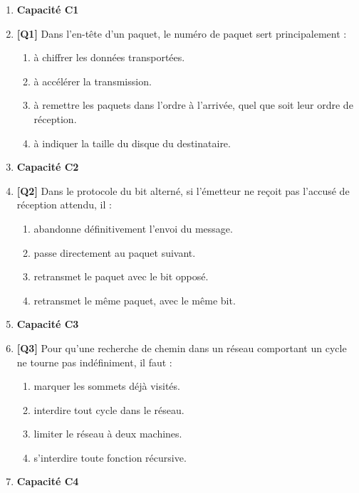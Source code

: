 \begin{enumerate}

\item[] \textbf{Capacité C1}

\item \textbf{[Q1]} Dans l'en-tête d'un paquet, le numéro de paquet sert principalement :
  \begin{enumerate}[label=\Alph*.]
    \item à chiffrer les données transportées.
    \item à accélérer la transmission.
    \item à remettre les paquets dans l'ordre à l'arrivée, quel que soit leur ordre de réception.
    \item à indiquer la taille du disque du destinataire.
  \end{enumerate}

\item[] \textbf{Capacité C2}

\item \textbf{[Q2]} Dans le protocole du bit alterné, si l'émetteur ne reçoit pas l'accusé de réception attendu, il :
  \begin{enumerate}[label=\Alph*.]
    \item abandonne définitivement l'envoi du message.
    \item passe directement au paquet suivant.
    \item retransmet le paquet avec le bit opposé.
    \item retransmet le même paquet, avec le même bit.
  \end{enumerate}

\item[] \textbf{Capacité C3}

\item \textbf{[Q3]} Pour qu'une recherche de chemin dans un réseau comportant un cycle ne tourne pas indéfiniment, il faut :
  \begin{enumerate}[label=\Alph*.]
    \item marquer les sommets déjà visités.
    \item interdire tout cycle dans le réseau.
    \item limiter le réseau à deux machines.
    \item s'interdire toute fonction récursive.
  \end{enumerate}

\item[] \textbf{Capacité C4}


\end{enumerate}
